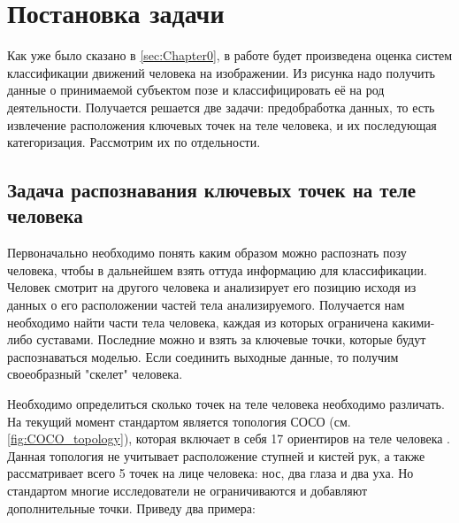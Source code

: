 \section{Постановка задачи}
\label{sec:Chapter1} 

Как уже было сказано в \autoref{sec:Chapter0}, в работе будет произведена оценка систем классификации движений человека на изображении. Из рисунка надо получить данные о принимаемой субъектом позе и классифицировать её на род деятельности. Получается решается две задачи: предобработка данных, то есть извлечение расположения ключевых точек на теле человека, и их последующая категоризация. Рассмотрим их по отдельности.


\subsection{Задача распознавания ключевых точек на теле человека}
\label{subsec:Theory of keypoint detection}

Первоначально необходимо понять каким образом можно распознать позу человека, чтобы в дальнейшем взять оттуда информацию для классификации. Человек смотрит на другого человека и анализирует его позицию исходя из данных о его расположении частей тела анализируемого. Получается нам необходимо найти части тела человека, каждая из которых ограничена какими-либо суставами. Последние можно и взять за ключевые точки, которые будут распознаваться моделью. Если соединить выходные данные, то получим своеобразный "скелет"{} человека.

Необходимо определиться сколько точек на теле человека необходимо различать. На текущий момент стандартом является топология СОСО (см. \autoref{fig:COCO_topology}), которая включает в себя 17 ориентиров на теле человека \cite{COCO_topology, COCO_dataset}. Данная топология не учитывает расположение ступней и кистей рук, а также рассматривает всего 5 точек на лице человека: нос, два глаза и два уха. Но стандартом многие исследователи не ограничиваются и добавляют дополнительные точки. Приведу два примера:

